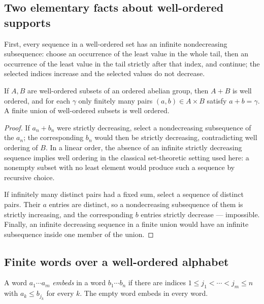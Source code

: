 \documentclass[11pt,letterpaper]{article}
\numberwithin{equation}{section}
\theoremstyle{definition}
\theoremstyle{remark}
\begin{document}
\subsection{Two elementary facts about well-ordered supports}
\label{diff:sub:app:twofacts}

First, every sequence in a well-ordered set has an infinite nondecreasing
subsequence: choose an occurrence of the least value in the whole tail, then an
occurrence of the least value in the tail strictly after that index, and
continue; the selected indices increase and the selected values do not
decrease.

\begin{lemma}
\label{diff:lem:twosupports}
If $A,B$ are well-ordered subsets of an ordered abelian group, then $A+B$ is
well ordered, and for each $\gamma$ only finitely many pairs
$(a,b)\in A\times B$ satisfy $a+b=\gamma$. A finite union of well-ordered
subsets is well ordered.
\end{lemma}
\begin{proof}
If $a_{n}+b_{n}$ were strictly decreasing, select a nondecreasing subsequence
of the $a_{n}$; the corresponding $b_{n}$ would then be strictly decreasing,
contradicting well ordering of $B$. In a linear order, the absence of an
infinite strictly decreasing sequence implies well ordering in the classical
set-theoretic setting used here: a nonempty subset with no least element would
produce such a sequence by recursive choice.

If infinitely many distinct pairs had a fixed sum, select a sequence of
distinct pairs. Their $a$ entries are distinct, so a nondecreasing subsequence
of them is strictly increasing, and the corresponding $b$ entries strictly
decrease --- impossible. Finally, an infinite decreasing sequence in a finite
union would have an infinite subsequence inside one member of the union.
\end{proof}

\subsection{Finite words over a well-ordered alphabet}
\label{diff:sub:app:higman}

A word $a_{1}\cdots a_{m}$ \emph{embeds} in a word $b_{1}\cdots b_{n}$ if
there are indices $1\leq j_{1}<\cdots<j_{m}\leq n$ with
$a_{k}\leq b_{j_{k}}$ for every $k$. The empty word embeds in every word.
\end{document}
